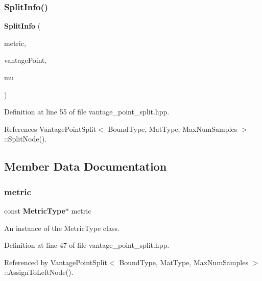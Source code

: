\subsubsection{Split\+Info()\hspace{0.1cm}{\footnotesize\ttfamily [2/2]}}
{\footnotesize\ttfamily \textbf{ Split\+Info} (\begin{DoxyParamCaption}\item[{const \textbf{ Metric\+Type} \&}]{metric,  }\item[{const Vec\+Type \&}]{vantage\+Point,  }\item[{\textbf{ Elem\+Type}}]{mu }\end{DoxyParamCaption})\hspace{0.3cm}{\ttfamily [inline]}}



Definition at line 55 of file vantage\+\_\+point\+\_\+split.\+hpp.



References Vantage\+Point\+Split$<$ Bound\+Type, Mat\+Type, Max\+Num\+Samples $>$\+::\+Split\+Node().



\subsection{Member Data Documentation}
\mbox{\label{structmlpack_1_1tree_1_1VantagePointSplit_1_1SplitInfo_aefb95f787fcd1b21b8a22aa287e2e9a9}} 
\subsubsection{metric}
{\footnotesize\ttfamily const \textbf{ Metric\+Type}$\ast$ metric}



An instance of the Metric\+Type class. 



Definition at line 47 of file vantage\+\_\+point\+\_\+split.\+hpp.



Referenced by Vantage\+Point\+Split$<$ Bound\+Type, Mat\+Type, Max\+Num\+Samples $>$\+::\+Assign\+To\+Left\+Node().

\mbox{\label{structmlpack_1_1tree_1_1VantagePointSplit_1_1SplitInfo_ab59cdbc0470f8193c2002e2d033c9c87}} 
